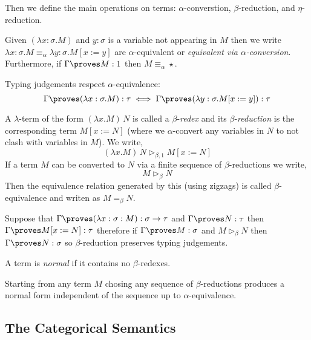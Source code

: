 \documentclass[12pt]{article}
\newcommand{\red}{\triangleright}
\newcommand{\aconv}{\equiv_{\alpha}}
\newcommand{\bredo}{\red_{\beta,1}}
\newcommand{\bred}{\red_{\beta}}
\begin{document}
Then we define the main operations on terms: $\alpha$-converstion, $\beta$-reduction, and $\eta$-reduction.

\begin{defn}
Given $(\lambda x : \sigma . M)$ and $y : \sigma$ is a variable not appearing in $M$ then we write $\lambda x : \sigma . M \aconv \lambda y : \sigma . M[x := y]$ are $\alpha$-equivalent or \textit{equivalent via $\alpha$-conversion}. Furthermore, if $\Gamma \proves M : 1$ then $M \aconv \star$.
\end{defn}

\begin{prop}
Typing judgements respect $\alpha$-equivalence:
\[ \Gamma \proves (\lambda x : \sigma . M) : \tau \iff \Gamma \proves (\lambda y : \sigma . M[x := y]) : \tau \]
\end{prop}

\begin{defn}
A $\lambda$-term of the form $(\lambda x.M) \, N$ is called a $\beta$-\textit{redex} and its $\beta$-\textit{reduction} is the corresponding term $M [x := N]$ (where we $\alpha$-convert any variables in $N$ to not clash with variables in $M$). We write,
\[ (\lambda x.M) \, N \bredo M [x := N] \]
If a term $M$ can be converted to $N$ via a finite sequence of $\beta$-reductions we write,
\[ M \bred N \]
Then the equivalence relation generated by this (using zigzags) is called $\beta$-equivalence and writen as $M =_\beta N$. 
\end{defn}

\begin{prop}
Suppose that $\Gamma \proves (\lambda x : \sigma : M) : \sigma \to \tau$ and $\Gamma \proves N : \tau$ then $\Gamma \proves M[x := N] : \tau$ therefore if $\Gamma \proves M : \sigma$ and $M \bred N$ then $\Gamma \proves N : \sigma$ so $\beta$-reduction preserves typing judgements.
\end{prop}

\begin{defn}
A term is \textit{normal} if it contains no $\beta$-redexes. 
\end{defn}

\begin{theorem}
Starting from any term $M$ chosing any sequence of $\beta$-reductions produces a normal form independent of the sequence up to $\alpha$-equivalence.
\end{theorem}

\subsection{The Categorical Semantics}
\end{document}
